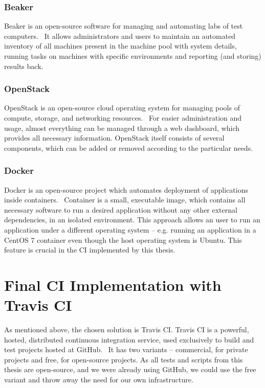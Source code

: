 \subsubsection{Beaker} \label{ref:beaker}
    Beaker is an open-source software for managing and automating labs of test
    computers.~\cite{beaker-docs} It allows administrators and users to maintain an
    automated inventory of all machines present in the machine pool with
    system details, running tasks on machines with specific environments and
    reporting (and storing) results back.

\subsubsection{OpenStack} \label{ref:openstack}
    OpenStack is an open-source cloud operating system for managing pools of compute, storage,
    and networking resources.~\cite{openstack-docs} For easier administration and
    usage, almost everything can be managed through a web dashboard, which provides
    all necessary information. OpenStack itself consists of several components,
    which can be added or removed according to the particular needs.

\subsubsection{Docker} \label{ref:docker}
    Docker is an open-source project which automates deployment of applications
    inside containers.~\cite{docker-docs} Container is a small, executable image,
    which contains all necessary software to run a desired application without
    any other external dependencies, in an isolated environment. This approach
    allows an user to run an application under a different operating system -- e.g.
    running an application in a CentOS 7 container even though the host operating
    system is Ubuntu. This feature is crucial in the CI implemented by this thesis.

\section{Final CI Implementation with Travis CI}
    As mentioned above, the chosen solution is Travis CI. Travis CI is a powerful,
    hosted, distributed continuous integration service, used exclusively to
    build and test projects hosted at GitHub.~\cite{travis-ci-docs} It has two
    variants -- commercial, for private projects and free, for open-source
    projects. As all tests and scripts from this thesis are open-source, and
    we were already using GitHub, we could use the free variant and throw away
    the need for our own infrastructure.

